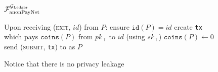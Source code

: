 \begin{figure}[H]
\begin{systembox}{$\mathcal{F}_{\mathrm{anonPayNet}}^{\mathcal{G}_{\mathrm{Ledger}}}$}
\begin{algorithmic}[1]
      \State Upon receiving (\textsc{exit}, $id$) from $P$:
      \Indent
        \State ensure $\mathtt{id}(P) = id$
        \State create \texttt{tx} which pays $\mathtt{coins}(P)$ from
        $pk_{\top}$ to $id$ (using $sk_{\top}$)
        \State $\mathtt{coins}(P) \gets 0$
        \State send (\textsc{submit}, \texttt{tx}) to \ledger as $P$
      \EndIndent
    \end{algorithmic}
  \end{systembox}
  \caption{Notice that there is no privacy leakage}
  \label{alg:anon-pay-func}
\end{figure}
